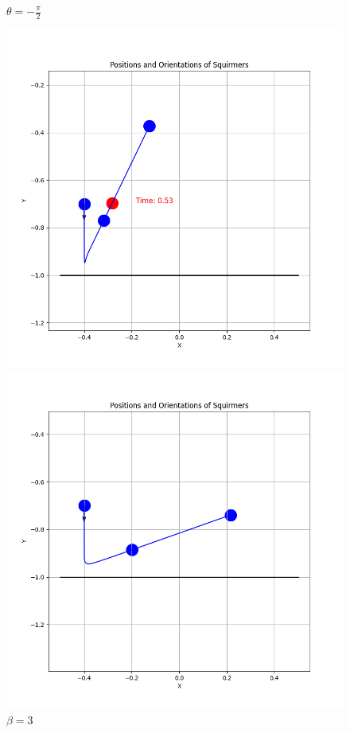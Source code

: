 \documentclass{article}
\begin{document}
\begin{figure}[H]
    \centering
    \textbf{$\theta = -\frac{\pi}{2}$}\par\medskip
    \begin{minipage}{0.49\textwidth}
        \includegraphics[width=1.1\textwidth]{graphs/simulations/border/beta1_5/mpi_2.png}
        \caption{\footnotesize $\beta = 1.5$}
    \end{minipage}\hfill
    \begin{minipage}{0.49\textwidth}
        \includegraphics[width=1.1\textwidth]{graphs/simulations/border/beta3/mpi_2.png}
        \caption{\footnotesize $\beta = 3$}
    \end{minipage}
\end{figure}
\end{document}

